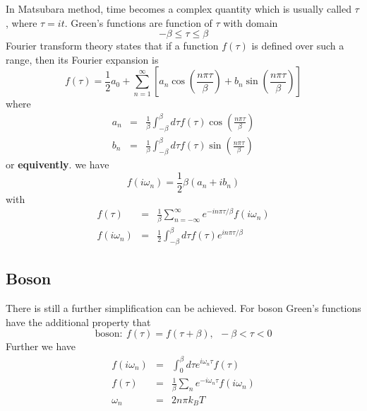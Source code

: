 In Matsubara method, time becomes a complex quantity which is usually called $\tau$, where $\tau = it$.
Green's functions are function of $\tau$ with domain
\begin{equation}
  \label{3.10}
  -\beta \leq \tau \leq \beta
\end{equation}
Fourier transform theory states that if a function $f(\tau)$ is defined over such a range, then its Fourier expansion is
\begin{equation}
  \label{3.11}
  f(\tau) = \frac{1}{2}a_0 + \sum_{n=1}^\infty \left[a_n \cos(\frac{n\pi\tau}{\beta}) + b_n \sin(\frac{n\pi\tau}{\beta})\right]
\end{equation}
where
\begin{eqnarray}
  a_n &=& \frac{1}{\beta} \int_{-\beta}^\beta d\tau f(\tau) \cos(\frac{n\pi\tau}{\beta}) \label{3.12} \\
  b_n &=& \frac{1}{\beta} \int_{-\beta}^\beta d\tau f(\tau) \sin(\frac{n\pi\tau}{\beta}) \label{3.13}
\end{eqnarray}
or \textbf{equivently}. we have
\begin{equation}
  f(i\omega_n) = \frac{1}{2} \beta(a_n + ib_n ) \label{3.14}
\end{equation}
with
\begin{eqnarray}
  f(\tau)&=&\frac{1}{\beta} \sum_{n=-\infty}^\infty e^{-in\pi\tau/\beta} f(i\omega_n) \label{3.15} \\
  f(i\omega_n)&=& \frac{1}{2} \int_{-\beta}^\beta d\tau f(\tau) e^{in\pi\tau/\beta}   \label{3.16}
\end{eqnarray}

\subsection{Boson}
There is still a further simplification can be achieved.
For boson Green's functions have the additional property that
\begin{equation}
  \label{3.17}
  \mathrm{boson:}~ f(\tau) = f(\tau+ \beta),~ ~ -\beta<\tau<0
\end{equation}
Further we have
\begin{eqnarray}
    f(i\omega_n)&=&\int_0^\beta d\tau e^{i\omega_n\tau} f(\tau) \nonumber \\
    f(\tau) &=& \frac{1}{\beta} \sum_n e^{-i\omega_n\tau} f(i\omega_n) \label{3.20} \\
    \omega_n &=& 2n\pi k_BT\nonumber
\end{eqnarray}

